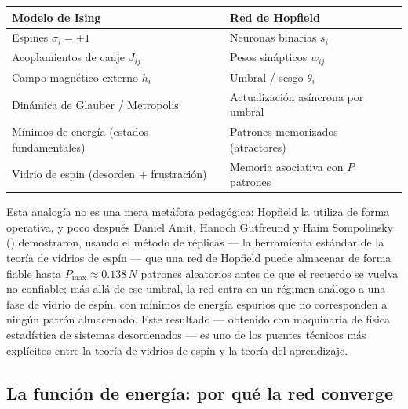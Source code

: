 \documentclass[12pt]{article}
\begin{document}
\begin{center}
\begin{tabular}{ll}
\textbf{Modelo de Ising} & \textbf{Red de Hopfield} \\
\hline
Espines $\sigma_i = \pm 1$ & Neuronas binarias $s_i$ \\
Acoplamientos de canje $J_{ij}$ & Pesos sinápticos $w_{ij}$ \\
Campo magnético externo $h_i$ & Umbral / sesgo $\theta_i$ \\
Dinámica de Glauber / Metropolis & Actualización asíncrona por umbral \\
Mínimos de energía (estados fundamentales) & Patrones memorizados (atractores) \\
Vidrio de espín (desorden + frustración) & Memoria asociativa con $P$ patrones \\
\end{tabular}
\end{center}

Esta analogía no es una mera metáfora pedagógica: Hopfield la utiliza de forma operativa, y poco después Daniel Amit, Hanoch Gutfreund y Haim Sompolinsky (\cite{amit1985}) demostraron, usando el método de réplicas --- la herramienta estándar de la teoría de vidrios de espín --- que una red de Hopfield puede almacenar de forma fiable hasta $P_{\max} \approx 0.138\,N$ patrones aleatorios antes de que el recuerdo se vuelva no confiable; más allá de ese umbral, la red entra en un régimen análogo a una fase de vidrio de espín, con mínimos de energía espurios que no corresponden a ningún patrón almacenado. Este resultado --- obtenido con maquinaria de física estadística de sistemas desordenados --- es uno de los puentes técnicos más explícitos entre la teoría de vidrios de espín y la teoría del aprendizaje.

\subsection{La función de energía: por qué la red converge}
\end{document}
